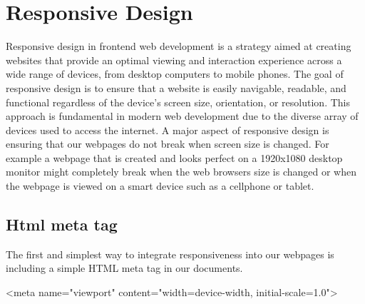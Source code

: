 \documentclass{report}
\begin{document}
    \pagebreak \bigbreak \noindent 
    \section{\LARGE Responsive Design}
    \bigbreak \noindent 
    \begin{concept}
        Responsive design in frontend web development is a strategy aimed at creating websites that provide an optimal viewing and interaction experience across a wide range of devices, from desktop computers to mobile phones. The goal of responsive design is to ensure that a website is easily navigable, readable, and functional regardless of the device's screen size, orientation, or resolution. This approach is fundamental in modern web development due to the diverse array of devices used to access the internet.
        \bigbreak \noindent 
        A major aspect of responsive design is ensuring that our webpages do not break when screen size is changed. For example a webpage that is created and looks perfect on a 1920x1080 desktop monitor might completely break when the web browsers size is changed or when the webpage is viewed on a smart device such as a cellphone or tablet.
    \end{concept}
    \bigbreak \noindent 
    \subsection{Html meta tag}
    \bigbreak \noindent 
    The first and simplest way to integrate responsiveness into our webpages is including a simple HTML meta tag in our documents.
    \begin{htmlcode}
<meta name="viewport" content="width=device-width, initial-scale=1.0">
    \end{htmlcode}

    \bigbreak \noindent 
\end{document}
